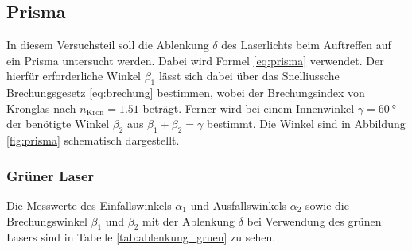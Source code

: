 





\subsection{Prisma}
\label{sec:ausw_prisma}
In diesem Versuchsteil soll die Ablenkung $\delta$ des Laserlichts beim Auftreffen auf ein Prisma untersucht werden.
Dabei wird Formel \eqref{eq:prisma} verwendet.
Der hierfür erforderliche Winkel $\beta_1$ lässt sich dabei über das Snelliussche Brechungsgesetz \eqref{eq:brechung} bestimmen,
wobei der Brechungsindex von Kronglas nach \cite[]{brechungsindex} $n_\text{Kron} = \num[]{1.51}$ beträgt.
Ferner wird bei einem Innenwinkel $\gamma = \qty[]{60}{\degree}$ der benötigte Winkel $\beta_2$ aus $\beta_1 + \beta_2 = \gamma$ bestimmt.
Die Winkel sind in Abbildung \ref{fig:prisma} schematisch dargestellt.


\subsubsection{Grüner Laser}
Die Messwerte des Einfallswinkels $\alpha_1$ und Ausfallswinkels $\alpha_2$ sowie
die Brechungswinkel $\beta_1$ und $\beta_2$ mit der Ablenkung $\delta$ bei Verwendung des grünen Lasers sind in Tabelle \ref{tab:ablenkung_gruen} zu sehen.

